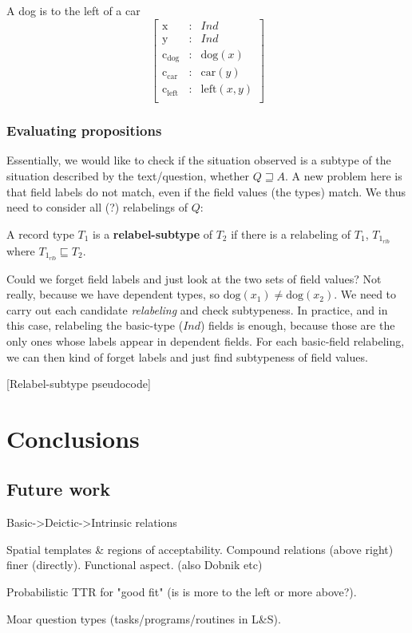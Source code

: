 \documentclass[11pt, a4paper]{article}
\begin{document}
A dog is to the left of a car
\begin{equation}\left[\begin{array}{rcl}
\text{x} &:& Ind\\
\text{y} &:& Ind\\
\text{c}_\text{dog} &:& \text{dog}(x)\\
\text{c}_\text{car} &:& \text{car}(y)\\
\text{c}_\text{left} &:& \text{left}(x, y)\\
\end{array}\right]\end{equation}

\subsubsection{Evaluating propositions}

Essentially, we would like to check if the situation observed is a subtype of the situation described by the text/question, whether $Q \sqsupseteq A$. A new problem here is that field labels do not match, even if the field values (the types) match. We thus need to consider all (?) relabelings of $Q$:

A record type $T_1$ is a \textbf{relabel-subtype} of $T_2$ if there is a relabeling of $T_1$, $T_{1_{rlb}}$ where $T_{1_{rlb}} \sqsubseteq T_2$.

Could we forget field labels and just look at the two sets of field values? Not really, because we have dependent types, so $\text{dog}(x_1) ≠ \text{dog}(x_2)$. We need to carry out each candidate \textit{relabeling} and check subtypeness. In practice, and in this case, relabeling the basic-type ($Ind$) fields is enough, because those are the only ones whose labels appear in dependent fields. For each basic-field relabeling, we can then kind of forget labels and just find subtypeness of field values.

[Relabel-subtype pseudocode]

\section{Conclusions}

\subsection{Future work}

Basic->Deictic->Intrinsic relations  \cite{LoganComputationalAnalysisApprehension1996}

Spatial templates \& regions of acceptability. Compound relations (above right) finer (directly). Functional aspect.  \cite{LoganComputationalAnalysisApprehension1996} (also Dobnik etc)

Probabilistic TTR for "good fit" (is is more to the left or more above?).

Moar question types (tasks/programs/routines in L\&S).


\end{document}
